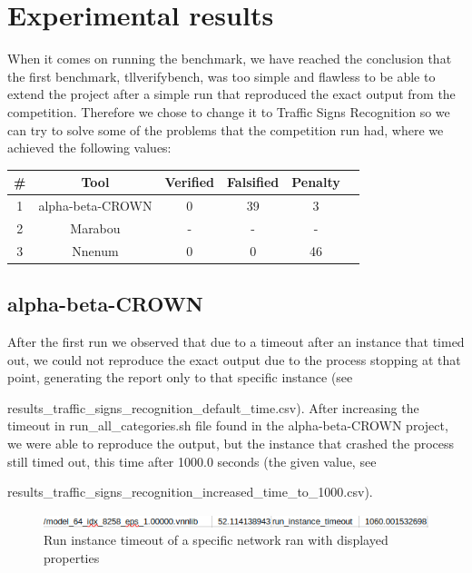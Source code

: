\documentclass[12pt,a4paper]{report}
\newcommand\tab[1][5mm]{\hspace*{#1}}
\begin{document}
\chapter{Experimental results}
\tab When it comes on running the benchmark, we have reached the conclusion that the first benchmark, tllverifybench\cite{tll_verify_bench}, was too simple and flawless to be able to extend the project after a simple run that reproduced the exact output from the competition. Therefore we chose to change it to Traffic Signs Recognition\cite{traffic_signs_recognition} so we can try to solve some of the problems that the competition run had, where we achieved the following values:

\begin{center}
\begin{tabular}{ c c c c c c}
 \hline
 \textbf{\#} & \textbf{Tool} & \textbf{Verified} & \textbf{Falsified} & \textbf{Penalty}\\
 \hline
 1 & alpha-beta-CROWN & 0 & 39 & 3\\
 \hline
 2 & Marabou & - & - & -\\
 \hline
 3 & Nnenum & 0 & 0 & 46\\
 \hline
\end{tabular}
\end{center}

\section{alpha-beta-CROWN}
\tab After the first run we observed that due to a timeout after an instance that timed out, we could not reproduce the exact output due to the process stopping at that point, generating the report only to that specific instance (see

results\_traffic\_signs\_recognition\_default\_time.csv\cite{traffic_signs_recognition_first_solution}). After increasing the timeout in run\_all\_categories.sh file found in the alpha-beta-CROWN project, we were able to reproduce the output, but the instance that crashed the process still timed out, this time after 1000.0 seconds (the given value, see

results\_traffic\_signs\_recognition\_increased\_time\_to\_1000.csv\cite{traffic_signs_recognition_second_solution}).\\

\begin{figure}[h]
\centering
\includegraphics[scale=0.6]{run_instance_timeout.png}
\caption{Run instance timeout of a specific network ran with displayed properties}
\end{figure}
\end{document}

